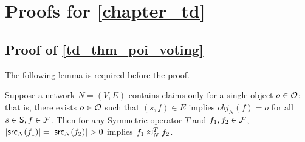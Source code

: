 \chapter{Proofs for \cref{chapter_td}}
\label{chapter_td_proofs}

\section{Proof of \cref{td_thm_poi_voting}}

The following lemma is required before the proof.

\begin{lemma}
\label{td_lemma_poi_voting_lemma}

Suppose a network $N=(V, E)$ contains claims only for a single object $o \in
\mathcal{O}$; that is, there exists $o \in \mathcal{O}$ such that $(s, f) \in E$ implies
$obj_N(f) = o$ for all $s \in \mathsf{S}, f \in \mathcal{F}$. Then for any Symmetric operator
$T$ and $f_1, f_2 \in \mathcal{F}$, $|\mathsf{src}_N(f_1)| = |\mathsf{src}_N(f_2)| > 0$ implies $f_1
\approx_N^T f_2$.

\end{lemma}

